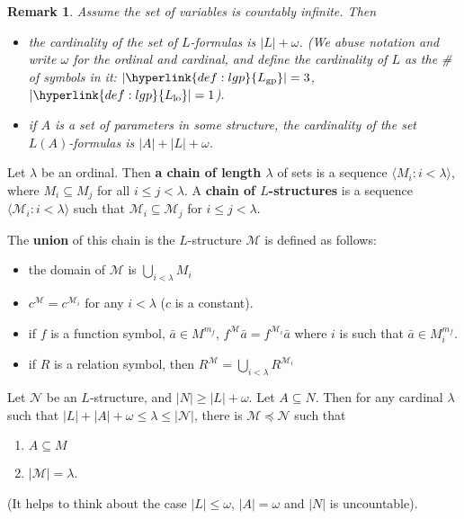 \documentclass{article}
\newtheorem{nremark}[nthm]{Remark}
\begin{document}
\begin{nremark}\label{rem:3.9}
  Assume the set of variables is countably infinite. Then
  \begin{itemize}[label=--]
    \item the cardinality of the set of $L$-formulas is $|L| + \omega$. (We abuse notation and write $\omega$ for the ordinal and cardinal, and define the cardinality of $L$ as the \# of symbols in it: $|\hyperlink{def:lgp}{L_{\text{gp}}}| = 3$, $|\hyperlink{def:lgp}{L_{\text{lo}}}| = 1$).
    \item if $A$ is a set of parameters in some structure, the cardinality of the set $L(A)$-formulas is $|A| + |L| + \omega$.
  \end{itemize}
\end{nremark}
\begin{ndef}\label{def:3.10}
  Let $\lambda$ be an ordinal. Then \textbf{a chain of length $\lambda$} of sets is a sequence $\langle M_i : i < \lambda \rangle$, where $M_i \subseteq M_j$ for all $i \leq j < \lambda$.
  A \textbf{chain of $L$-structures} is a sequence $\langle \mathcal{M}_i : i < \lambda \rangle$ such that $\mathcal{M}_i \subseteq \mathcal{M}_j$ for $i \leq j < \lambda$.

  The \textbf{union} of this chain is the $L$-structure $\mathcal{M}$ is defined as follows:
  \begin{itemize}[label=--]
    \item the domain of $\mathcal{M}$ is $\bigcup_{i < \lambda} M_i$
    \item $c^\mathcal{M} = c^{\mathcal{M}_i}$ for any $i < \lambda$ ($c$ is a constant).
    \item if $f$ is a function symbol, $\bar{a} \in M^{m_f}$, $f^\mathcal{M}\bar{a} = f^{\mathcal{M}_i} \bar{a}$ where $i$ is such that $\bar{a} \in M_i^{m_f}$.
    \item if $R$ is a relation symbol, then $R^\mathcal{M} = \bigcup_{i < \lambda} R^{\mathcal{M}_i}$
  \end{itemize}
\end{ndef}

\begin{nthm}\label{thm:3.11DLS}
  Let $\mathcal{N}$ be an $L$-structure, and $|N| \geq |L| + \omega$.
  Let $A \subseteq N$.
  Then for any cardinal $\lambda$ such that $|L| + |A| + \omega \leq \lambda \leq |\mathcal{N}|$, there is $\mathcal{M} \preccurlyeq \mathcal{N}$ such that
  \begin{enumerate}[label=(\roman*)]
    \item $A \subseteq M$
    \item $|\mathcal{M}| = \lambda$.
  \end{enumerate}
\end{nthm}
(It helps to think about the case $|L| \leq \omega$, $|A| = \omega$ and $|N|$ is uncountable).
\end{document}
